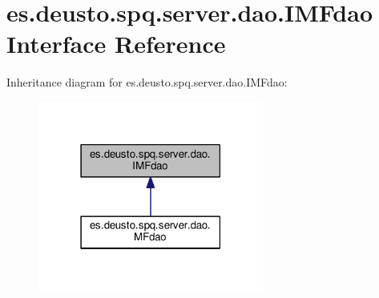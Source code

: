 \hypertarget{interfacees_1_1deusto_1_1spq_1_1server_1_1dao_1_1_i_m_fdao}{}\section{es.\+deusto.\+spq.\+server.\+dao.\+I\+M\+Fdao Interface Reference}
\label{interfacees_1_1deusto_1_1spq_1_1server_1_1dao_1_1_i_m_fdao}


Inheritance diagram for es.\+deusto.\+spq.\+server.\+dao.\+I\+M\+Fdao\+:\nopagebreak
\begin{figure}[H]
\begin{center}
\leavevmode
\includegraphics[width=210pt]{interfacees_1_1deusto_1_1spq_1_1server_1_1dao_1_1_i_m_fdao__inherit__graph}
\end{center}
\end{figure}
